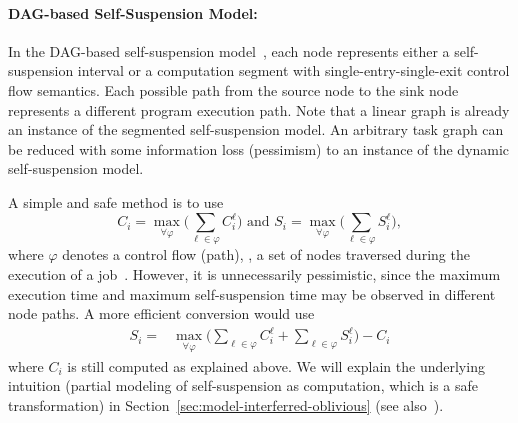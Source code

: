 \paragraph{DAG-based Self-Suspension Model:} 


In the {DAG-based} self-suspension model~\cite{bletsas:thesis}, each node represents either a self-suspension interval or a computation segment
with single-entry-single-exit control flow semantics. Each possible path from the source node to the sink node
represents a different program execution path. Note that a linear graph is already an instance of the segmented self-suspension model.
An arbitrary task graph can be reduced with some information loss (pessimism) to an instance of the dynamic self-suspension model. 







%
%
%
A simple and safe method is to use
\begin{equation*} 
C_i =  \max_{\forall \varphi} \Big(  \sum_{\ell \in \varphi} C_i^\ell   \Big)        \mbox{   and }
S_i =  \max_{\forall \varphi} \Big(  \sum_{\ell \in \varphi} S_i^\ell   \Big),
\end{equation*}
where $\varphi$ denotes a control flow (path), \ie, a set of nodes traversed during the execution of a job~\cite{RTAS-AudsleyB04,bletsas:thesis}. However, it is unnecessarily pessimistic, since the maximum execution time and maximum self-suspension 
time may be observed in different node paths. A more efficient conversion would use
\begin{align} 
S_i =  &\max_{\forall \varphi} \Big(  \sum_{\ell \in \varphi} C_i^\ell + \sum_{\ell \in \varphi} S_i^\ell   \Big)  - C_i  \nonumber
\end{align}
where $C_i$ is still computed as explained above. We will explain the underlying intuition  (partial modeling of self-suspension as computation, which is a safe transformation) 
in Section~\ref{sec:model-interferred-oblivious} (see also~\cite{RTAS-AudsleyB04,BletsasReport2015}).

